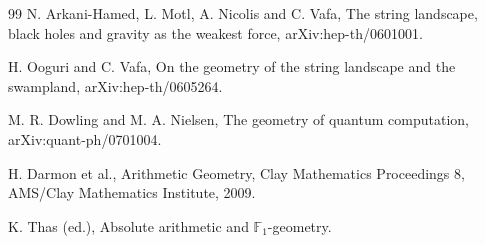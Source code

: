 \documentclass[11pt]{amsart}
\begin{document}
\begin{thebibliography}{99}
N. Arkani-Hamed, L. Motl, A. Nicolis and C. Vafa, The string landscape, black holes and gravity as the weakest force, arXiv:hep-th/0601001.

H. Ooguri and C. Vafa, On the geometry of the string landscape and the swampland, arXiv:hep-th/0605264.

M. R. Dowling and M. A. Nielsen, The geometry of quantum computation, arXiv:quant-ph/0701004.

H. Darmon et al., Arithmetic Geometry, Clay Mathematics Proceedings 8, AMS/Clay Mathematics Institute, 2009.

K. Thas (ed.), Absolute arithmetic and $\mathbb F_1$-geometry.

\end{thebibliography}
\end{document}
